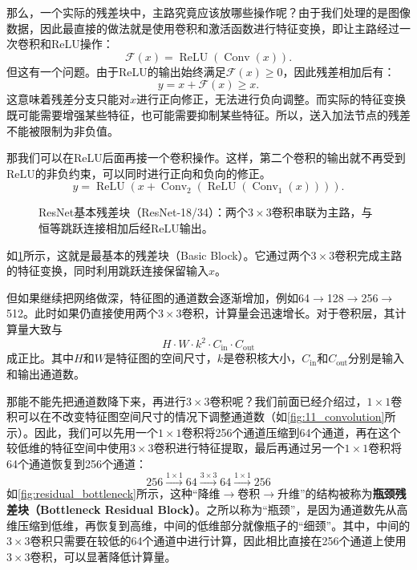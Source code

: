 那么，一个实际的残差块中，主路究竟应该放哪些操作呢？由于我们处理的是图像数据，因此最直接的做法就是使用卷积和激活函数进行特征变换，即让主路经过一次卷积和ReLU操作：
$$
\mathcal{F}(x)=\operatorname{ReLU}(\operatorname{Conv}(x)).
$$
但这有一个问题。由于ReLU的输出始终满足$\mathcal{F}(x)\geq0$，因此残差相加后有：
$$
y=x+\mathcal{F}(x)\geq x.
$$
这意味着残差分支只能对$x$进行正向修正，无法进行负向调整。而实际的特征变换既可能需要增强某些特征，也可能需要抑制某些特征。所以，送入加法节点的残差不能被限制为非负值。

那我们可以在ReLU后面再接一个卷积操作。这样，第二个卷积的输出就不再受到ReLU的非负约束，可以同时进行正向和负向的修正。
$$
y=\operatorname{ReLU}\left(x+\operatorname{Conv}_2\left(\operatorname{ReLU}\left(\operatorname{Conv}_1(x)\right)\right)\right).
$$

\begin{figure}[H]
    \caption{ResNet基本残差块（ResNet-18/34）：两个$3\times 3$卷积串联为主路，与恒等跳跃连接相加后经ReLU输出。}
    \label{fig:residual_basic}
\end{figure}

如\cref{fig:residual_basic}所示，这就是最基本的残差块（Basic Block）。它通过两个$3\times3$卷积完成主路的特征变换，同时利用跳跃连接保留输入$x$。

但如果继续把网络做深，特征图的通道数会逐渐增加，例如64$\to$128$\to$256$\to$512。此时如果仍直接使用两个$3\times3$卷积，计算量会迅速增长。对于卷积层，其计算量大致与
$$
H\cdot W\cdot k^2\cdot C_{\mathrm{in}}\cdot C_{\mathrm{out}}
$$
成正比。其中$H$和$W$是特征图的空间尺寸，$k$是卷积核大小，$C_{\mathrm{in}}$和$C_{\mathrm{out}}$分别是输入和输出通道数。

那能不能先把通道数降下来，再进行$3\times3$卷积呢？我们前面已经介绍过，$1\times1$卷积可以在不改变特征图空间尺寸的情况下调整通道数（如\cref{fig:11_convolution}所示）。因此，我们可以先用一个$1\times1$卷积将256个通道压缩到64个通道，再在这个较低维的特征空间中使用$3\times3$卷积进行特征提取，最后再通过另一个$1\times1$卷积将64个通道恢复到256个通道：
$$
256\xrightarrow{1\times1}64\xrightarrow{3\times3}64\xrightarrow{1\times1}256
$$
如\cref{fig:residual_bottleneck}所示，这种“降维$\rightarrow$卷积$\rightarrow$升维”的结构被称为\textbf{瓶颈残差块（Bottleneck Residual Block）}。之所以称为“瓶颈”，是因为通道数先从高维压缩到低维，再恢复到高维，中间的低维部分就像瓶子的“细颈”。其中，中间的$3\times3$卷积只需要在较低的64个通道中进行计算，因此相比直接在256个通道上使用$3\times3$卷积，可以显著降低计算量。

